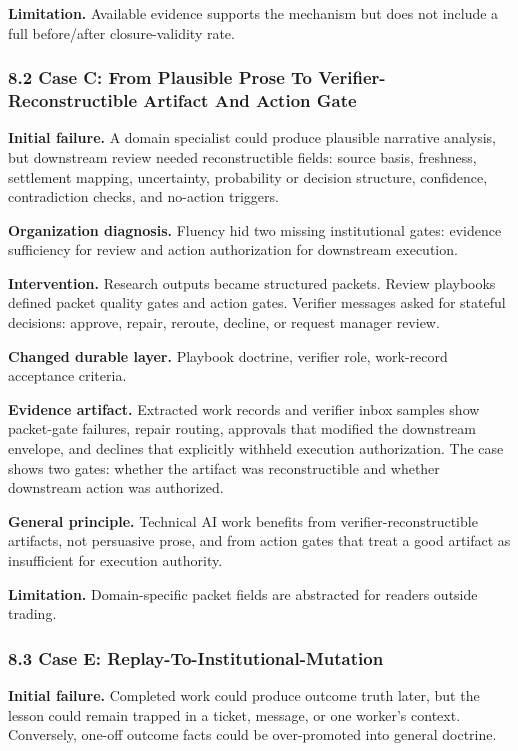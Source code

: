 \documentclass[
]{article}
\begin{document}
\textbf{Limitation.} Available evidence supports the mechanism but does not include a full before/after closure-validity rate.

\subsubsection{8.2 Case C: From Plausible Prose To Verifier-Reconstructible Artifact And Action Gate}\label{case-c-from-plausible-prose-to-verifier-reconstructible-artifact-and-action-gate}

\textbf{Initial failure.} A domain specialist could produce plausible narrative analysis, but downstream review needed reconstructible fields: source basis, freshness, settlement mapping, uncertainty, probability or decision structure, confidence, contradiction checks, and no-action triggers.

\textbf{Organization diagnosis.} Fluency hid two missing institutional gates: evidence sufficiency for review and action authorization for downstream execution.

\textbf{Intervention.} Research outputs became structured packets. Review playbooks defined packet quality gates and action gates. Verifier messages asked for stateful decisions: approve, repair, reroute, decline, or request manager review.

\textbf{Changed durable layer.} Playbook doctrine, verifier role, work-record acceptance criteria.

\textbf{Evidence artifact.} Extracted work records and verifier inbox samples show packet-gate failures, repair routing, approvals that modified the downstream envelope, and declines that explicitly withheld execution authorization. The case shows two gates: whether the artifact was reconstructible and whether downstream action was authorized.

\textbf{General principle.} Technical AI work benefits from verifier-reconstructible artifacts, not persuasive prose, and from action gates that treat a good artifact as insufficient for execution authority.

\textbf{Limitation.} Domain-specific packet fields are abstracted for readers outside trading.

\subsubsection{8.3 Case E: Replay-To-Institutional-Mutation}\label{case-e-replay-to-institutional-mutation}

\textbf{Initial failure.} Completed work could produce outcome truth later, but the lesson could remain trapped in a ticket, message, or one worker's context. Conversely, one-off outcome facts could be over-promoted into general doctrine.
\end{document}
